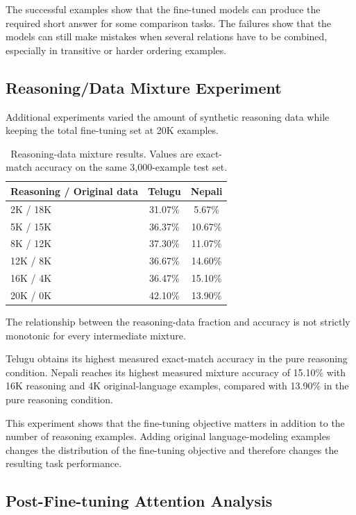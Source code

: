 \documentclass[10pt,a4paper]{article}
\begin{document}
The successful examples show that the fine-tuned models can produce
the required short answer for some comparison tasks. The failures
show that the models can still make mistakes when several relations
have to be combined, especially in transitive or harder ordering
examples.

\subsection{Reasoning/Data Mixture Experiment}

Additional experiments varied the amount of synthetic reasoning data
while keeping the total fine-tuning set at 20K examples.

\begin{table}[H]
\centering
\scriptsize
\caption{Reasoning-data mixture results. Values are exact-match
accuracy on the same 3,000-example test set.}
\begin{tabular}{lcc}
\toprule
Reasoning / Original data & Telugu & Nepali\\
\midrule
2K / 18K & 31.07\% & 5.67\%\\
5K / 15K & 36.37\% & 10.67\%\\
8K / 12K & 37.30\% & 11.07\%\\
12K / 8K & 36.67\% & 14.60\%\\
16K / 4K & 36.47\% & 15.10\%\\
20K / 0K & 42.10\% & 13.90\%\\
\bottomrule
\end{tabular}
\end{table}

The relationship between the reasoning-data fraction and accuracy is
not strictly monotonic for every intermediate mixture.

Telugu obtains its highest measured exact-match accuracy in the pure
reasoning condition. Nepali reaches its highest measured mixture
accuracy of 15.10\% with 16K reasoning and 4K original-language
examples, compared with 13.90\% in the pure reasoning condition.

This experiment shows that the fine-tuning objective matters in
addition to the number of reasoning examples. Adding original
language-modeling examples changes the distribution of the fine-tuning
objective and therefore changes the resulting task performance.

\subsection{Post-Fine-tuning Attention Analysis}
\end{document}
